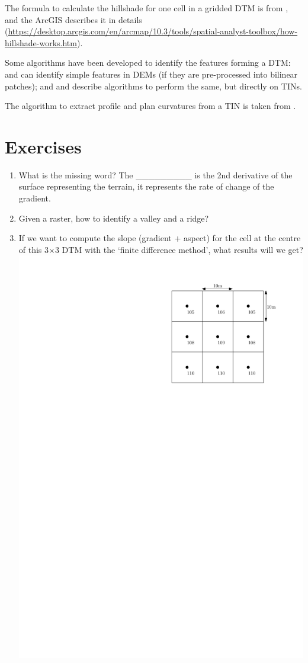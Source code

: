 The formula to calculate the hillshade for one cell in a gridded DTM is from \citet{Burrough98}, and the ArcGIS describes it in details (\url{https://desktop.arcgis.com/en/arcmap/10.3/tools/spatial-analyst-toolbox/how-hillshade-works.htm}).

Some algorithms have been developed to identify the features forming a DTM: \citet{Kweon94} and \citet{Schneider05} can identify simple features in DEMs (if they are pre-processed into bilinear patches); and \citet{Magillo09} and \citet{Edelsbrunner01-1} describe algorithms to perform the same, but directly on TINs.

The algorithm to extract profile and plan curvatures from a TIN is taken from \citet{vanKreveld97}.



%
\section{Exercises}

\begin{enumerate}
  \item What is the missing word? The \_\_\_\_\_\_\_\_\_ is the 2nd derivative of the surface representing the terrain, it represents the rate of change of the gradient.
  \item Given a raster, how to identify a valley and a ridge?
  \item If we want to compute the slope (gradient + aspect) for the cell at the centre of this 3$\times$3 DTM with the `finite difference method', what results will we get?
  \\
  \includegraphics[width=0.4\linewidth]{figs/slope_grid_question}
\end{enumerate}
